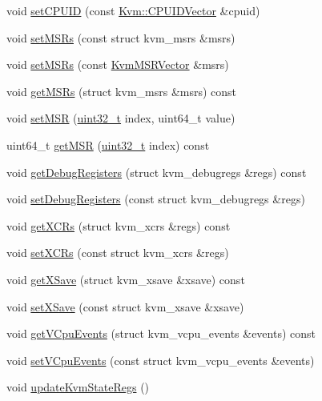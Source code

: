 \begin{DoxyCompactItemize}
\item 
void \hyperlink{classX86KvmCPU_a6782fae08bf69ed6903f49bfbee81566}{setCPUID} (const \hyperlink{classstd_1_1vector}{Kvm::CPUIDVector} \&cpuid)
\item 
void \hyperlink{classX86KvmCPU_a37c723660e4a4aa0ebb42ee498df990b}{setMSRs} (const struct kvm\_\-msrs \&msrs)
\item 
void \hyperlink{classX86KvmCPU_acc0ac79f886623c5e0ce73b393402148}{setMSRs} (const \hyperlink{classstd_1_1vector}{KvmMSRVector} \&msrs)
\item 
void \hyperlink{classX86KvmCPU_aee0c514e035c18531c33ea1219e621bf}{getMSRs} (struct kvm\_\-msrs \&msrs) const 
\item 
void \hyperlink{classX86KvmCPU_a3d32029e1dfb4da512897794d56e9fc8}{setMSR} (\hyperlink{Type_8hh_a435d1572bf3f880d55459d9805097f62}{uint32\_\-t} index, uint64\_\-t value)
\item 
uint64\_\-t \hyperlink{classX86KvmCPU_ad242a06d6443c10c74eac568fb44fcfe}{getMSR} (\hyperlink{Type_8hh_a435d1572bf3f880d55459d9805097f62}{uint32\_\-t} index) const 
\item 
void \hyperlink{classX86KvmCPU_a62688c8626ebb350e3748a2cd1fa44a8}{getDebugRegisters} (struct kvm\_\-debugregs \&regs) const 
\item 
void \hyperlink{classX86KvmCPU_a0c0b94046f41e2b83c8f224e9f227d0f}{setDebugRegisters} (const struct kvm\_\-debugregs \&regs)
\item 
void \hyperlink{classX86KvmCPU_a6744a04655bbdcee8aa24919573d8698}{getXCRs} (struct kvm\_\-xcrs \&regs) const 
\item 
void \hyperlink{classX86KvmCPU_a929420a323cb83ab21bdf3efa22edd24}{setXCRs} (const struct kvm\_\-xcrs \&regs)
\item 
void \hyperlink{classX86KvmCPU_af9f89d561ce9170ad89e6582071c1169}{getXSave} (struct kvm\_\-xsave \&xsave) const 
\item 
void \hyperlink{classX86KvmCPU_aa05e7c39fbe7374815b387728b7de06d}{setXSave} (const struct kvm\_\-xsave \&xsave)
\item 
void \hyperlink{classX86KvmCPU_a7c08fc9f9ab36f8eda2a3cfe6c234635}{getVCpuEvents} (struct kvm\_\-vcpu\_\-events \&events) const 
\item 
void \hyperlink{classX86KvmCPU_a70cfa7f84580af5396fbc82f540c8a5b}{setVCpuEvents} (const struct kvm\_\-vcpu\_\-events \&events)
\item 
void \hyperlink{classX86KvmCPU_a54e3879c7bcd8aac9d1b88350e7674fe}{updateKvmStateRegs} ()
\item 

\end{DoxyCompactItemize}
